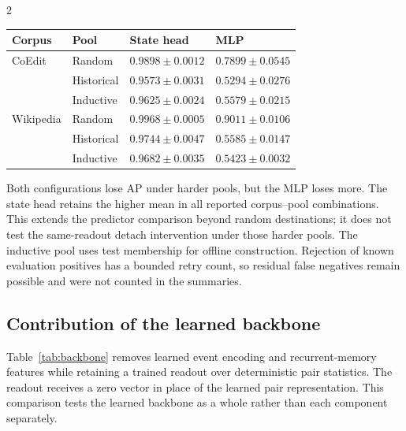 \documentclass[a4paper,10pt,fleqn]{article}
\renewcommand{\small}{\fontsize{8}{12}\selectfont}
\begin{document}
\begin{multicols}{2}
\begin{center}
\begin{minipage}{\linewidth}\centering
{}\label{tab:negatives}
\small\setlength{\tabcolsep}{3pt}
\begin{tabular}{@{}llll@{}}
\toprule
Corpus & Pool & State head & MLP\\ \midrule
CoEdit & Random & $0.9898\pm0.0012$ & $0.7899\pm0.0545$\\
 & Historical & $0.9573\pm0.0031$ & $0.5294\pm0.0276$\\
 & Inductive & $0.9625\pm0.0024$ & $0.5579\pm0.0215$\\
Wikipedia & Random & $0.9968\pm0.0005$ & $0.9011\pm0.0106$\\
 & Historical & $0.9744\pm0.0047$ & $0.5585\pm0.0147$\\
 & Inductive & $0.9682\pm0.0035$ & $0.5423\pm0.0032$\\
\bottomrule
\end{tabular}
\end{minipage}
\end{center}

Both configurations lose AP under harder pools, but the MLP loses more. The state head retains the higher mean in all reported corpus--pool combinations. This extends the predictor comparison beyond random destinations; it does not test the same-readout detach intervention under those harder pools. The inductive pool uses test membership for offline construction. Rejection of known evaluation positives has a bounded retry count, so residual false negatives remain possible and were not counted in the summaries.

\subsection{Contribution of the learned backbone}
Table~\ref{tab:backbone} removes learned event encoding and recurrent-memory features while retaining a trained readout over deterministic pair statistics. The readout receives a zero vector in place of the learned pair representation. This comparison tests the learned backbone as a whole rather than each component separately.


\end{multicols}
\end{document}
